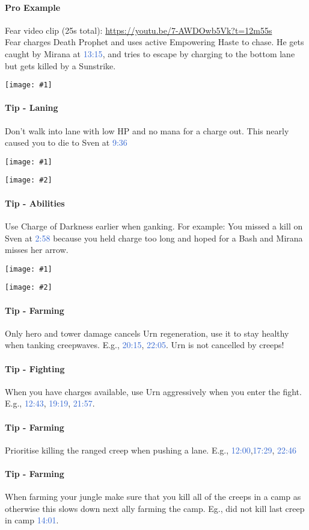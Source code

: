 \documentclass{article}
\newcommand{\logref}[1]{\textcolor{highlight}{#1}}
\newcommand{\bigscreenshot}[1]{
    \begin{center}
    \begin{minipage}[t]{0.9\textwidth}
        \texttt{[image: \#1]}
    \end{minipage}
\end{center}
}
\newcommand{\twoscreenshots}[2]{
\begin{center}
    \begin{minipage}[t]{0.4\textwidth}
        \begin{center}
            \texttt{[image: \#1]}
            \end{center}
    \end{minipage}
    \begin{minipage}[t]{0.4\textwidth}
            \begin{center}
        \texttt{[image: \#2]}
                \paragraph{}\hfill
            \end{center}
    \end{minipage}
\end{center}
}
\begin{document}
\paragraph{Pro Example}
Fear video clip (25s total): \url{https://youtu.be/7-AWDOwb5Vk?t=12m55s}\\  
Fear charges Death Prophet and uses active Empowering Haste to chase. He gets caught by Mirana at \logref{13:15}, and tries to escape by charging to the bottom lane but gets killed by a Sunstrike.
\bigscreenshot{img/Fear_Charge_Escape.png}

\paragraph{Tip - Laning}
Don't walk into lane with low HP and no mana for a charge out. This nearly caused you to die to Sven at \logref{9:36}
\twoscreenshots{img/929.jpg}{img/933.jpg}

\paragraph{Tip - Abilities}
Use Charge of Darkness earlier when ganking. For example: You missed a kill on Sven at \logref{2:58} because you held charge too long and hoped for a Bash and Mirana misses her arrow.
\twoscreenshots{img/255.jpg}{img/257.jpg}

\paragraph{Tip - Farming }
Only hero and tower damage cancels Urn regeneration, use it to stay healthy when tanking creepwaves. E.g., \logref{20:15}, \logref{22:05}. Urn is not cancelled by creeps!

\paragraph{Tip - Fighting}
When you have charges available, use Urn aggressively when you enter the fight. E.g.,  \logref{12:43}, \logref{19:19}, \logref{21:57}.

\paragraph{Tip - Farming}
Prioritise killing the ranged creep when pushing a lane. E.g., \logref{12:00},\logref{17:29}, \logref{22:46}

\paragraph{Tip - Farming}
When farming your jungle make sure that you kill all of the creeps in a camp as otherwise this slows down next ally farming the camp. Eg., did not kill last creep in camp \logref{14:01}.
\end{document}
